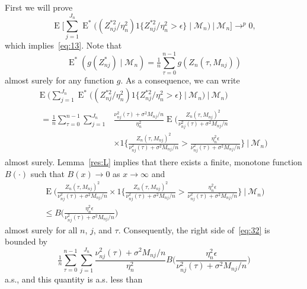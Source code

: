 \documentclass[11pt]{article}
\theoremstyle{definition}
\DeclareMathOperator{\E}{E}
\begin{document}
First we will prove
\begin{equation}\label{eq:41}
  \E\Big[ \sum_{j=1}^{J_n} \E^{*}\big((Z_{nj}^{*2} / \eta_n^2) 1\{
  Z_{nj}^{*2} / \eta_n^2 > \epsilon\} \mid \mathcal{M}_n\big) \ \Big|\
  \mathcal{M}_n\Big] \to^p 0,
\end{equation}
which implies~\eqref{eq:13}.  Note that
\begin{equation*}
  \E^{*}(g(Z_{nj}^{*}) \mid \mathcal{M}_n) = \tfrac{1}{n}
  \sum_{\tau=0}^{n-1} g(Z_n(\tau, M_{nj}))
\end{equation*}
almost surely for any function $g$.  As a consequence, we can write
\begin{multline}\label{eq:32}
  \E\Big( \sum_{j=1}^{J_n} \E^{*}\big( (Z_{nj}^{*2}/\eta_n^{2})
  1\{Z_{nj}^{*2}/\eta_n^{2} > \epsilon\} \ \big|\ \mathcal{M}_n\big)
  \ \Big|\ \mathcal{M}_{n} \Big)
  \\\begin{split}= \tfrac{1}{n} \sum_{\tau=0}^{n-1} \sum_{j=1}^{J_n} &
     \frac{\nu_{nj}^2(\tau) + \sigma^2 M_{nj} / n}{\eta_n^2}
  \E\Bigg( \frac{Z_n(\tau, M_{nj})^2}{\nu_{nj}^2(\tau) + \sigma^2 M_{nj} / n} 
  \\ & \times 1\Bigg\{\frac{Z_n(\tau, M_{nj})^2}{\nu_{nj}^2(\tau) + \sigma^2 M_{nj} / n} 
  > \frac{\eta_n^2 \epsilon}{\nu_{nj}^2(\tau) + \sigma^2 M_{nj} / n}\Bigg\} 
  \ \Bigg|\ \mathcal{M}_n \Bigg)
\end{split}
\end{multline}
almost surely.  Lemma~\ref{res:L} implies that there exists a finite,
monotone function $B(\cdot)$ such that $B(x) \to 0$ as $x \to \infty$
and
\begin{multline*}
\E\Bigg( \frac{Z_n(\tau, M_{nj})^2}{\nu_{nj}^2(\tau) + \sigma^2 M_{nj} / n}
  \times 1\Bigg\{\frac{Z_n(\tau, M_{nj})^2}{\nu_{nj}^2(\tau) + \sigma^2 M_{nj} / n} > \frac{\eta_n^2 \epsilon}{\nu_{nj}^2(\tau) + \sigma^2 M_{nj} / n}\Bigg\} 
  \ \Bigg|\ \mathcal{M}_n \Bigg) \\
  \leq B\Bigg(\frac{\eta_n^2\epsilon}{\nu_{nj}^2(\tau) + \sigma^2 M_{nj} / n}\Bigg)
\end{multline*}
almost surely for all $n$, $j$, and $\tau$.  Consequently, the right
side of~\eqref{eq:32} is bounded by
\begin{equation*}
\tfrac{1}{n} \sum_{\tau=0}^{n-1} \sum_{j=1}^{J_n} 
\frac{\nu_{nj}^2(\tau) + \sigma^2 M_{nj}/n}{\eta_n^2} B\Bigg(\frac{\eta_n^2
  \epsilon}{\nu_{nj}^2(\tau) + \sigma^2 M_{nj} / n}\Bigg)
\end{equation*}
a.s., and this quantity is a.s. less than
\end{document}
